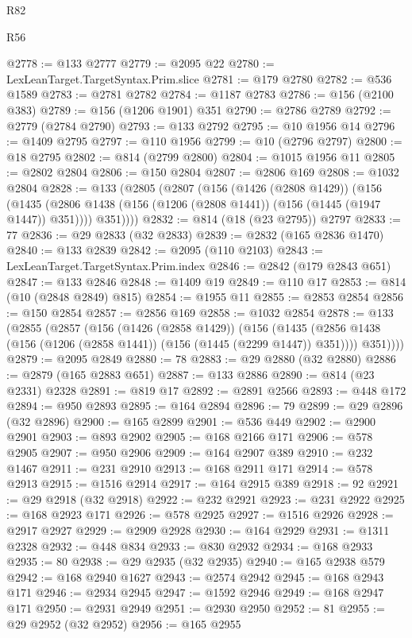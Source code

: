 \begin{lexlean}{R82}
\begin{lexlean}{R56}
\begin{coremodule}
{{{{{{{{{{{{{{{{{{{{{{{{{{{{{{{{{{{{{{{{{{{{{{{{{{{{{{{{{{{{{{{{{{{{{{{{{{{{{{{{{{{{{{{{{{{{{{{{{{{{{{{{{{{{{{{{{{{{{{{{{{{{{{{{{{{{{{{{{{{{{{{{{{{{{{{{{{{{{{{{{{{{{{{{{{{{{{{{{{{{{{{{{{{{{{{{{{{{{{{{{{{{{{{{{{{@2778 := @133 @2777
@2779 := @2095 @22
@2780 := LexLeanTarget.TargetSyntax.Prim.slice
@2781 := @179 @2780
@2782 := @536 @1589
@2783 := @2781 @2782
@2784 := @1187 @2783
@2786 := @156 (@2100 @383)
@2789 := @156 (@1206 @1901) @351
@2790 := @2786 @2789
@2792 := @2779 (@2784 @2790)
@2793 := @133 @2792
@2795 := @10 @1956 @14
@2796 := @1409 @2795
@2797 := @110 @1956
@2799 := @10 (@2796 @2797)
@2800 := @18 @2795
@2802 := @814 (@2799 @2800)
@2804 := @1015 @1956 @11
@2805 := @2802 @2804
@2806 := @150 @2804
@2807 := @2806 @169
@2808 := @1032 @2804
@2828 := @133
    (@2805
      (@2807
        (@156
          (@1426 (@2808 @1429))
          (@156
            (@1435 (@2806 @1438 (@156 (@1206 (@2808 @1441)) (@156 (@1445 (@1947 @1447)) @351))))
            @351))))
@2832 := @814 (@18 (@23 @2795)) @2797
@2833 := 77
@2836 := @29 @2833 (@32 @2833)
@2839 := @2832 (@165 @2836 @1470)
@2840 := @133 @2839
@2842 := @2095 (@110 @2103)
@2843 := LexLeanTarget.TargetSyntax.Prim.index
@2846 := @2842 (@179 @2843 @651)
@2847 := @133 @2846
@2848 := @1409 @19
@2849 := @110 @17
@2853 := @814 (@10 (@2848 @2849) @815)
@2854 := @1955 @11
@2855 := @2853 @2854
@2856 := @150 @2854
@2857 := @2856 @169
@2858 := @1032 @2854
@2878 := @133
    (@2855
      (@2857
        (@156
          (@1426 (@2858 @1429))
          (@156
            (@1435 (@2856 @1438 (@156 (@1206 (@2858 @1441)) (@156 (@1445 (@2299 @1447)) @351))))
            @351))))
@2879 := @2095 @2849
@2880 := 78
@2883 := @29 @2880 (@32 @2880)
@2886 := @2879 (@165 @2883 @651)
@2887 := @133 @2886
@2890 := @814 (@23 @2331) @2328
@2891 := @819 @17
@2892 := @2891 @2566
@2893 := @448 @172
@2894 := @950 @2893
@2895 := @164 @2894
@2896 := 79
@2899 := @29 @2896 (@32 @2896)
@2900 := @165 @2899
@2901 := @536 @449
@2902 := @2900 @2901
@2903 := @893 @2902
@2905 := @168 @2166 @171
@2906 := @578 @2905
@2907 := @950 @2906
@2909 := @164 @2907 @389
@2910 := @232 @1467
@2911 := @231 @2910
@2913 := @168 @2911 @171
@2914 := @578 @2913
@2915 := @1516 @2914
@2917 := @164 @2915 @389
@2918 := 92
@2921 := @29 @2918 (@32 @2918)
@2922 := @232 @2921
@2923 := @231 @2922
@2925 := @168 @2923 @171
@2926 := @578 @2925
@2927 := @1516 @2926
@2928 := @2917 @2927
@2929 := @2909 @2928
@2930 := @164 @2929
@2931 := @1311 @2328
@2932 := @448 @834
@2933 := @830 @2932
@2934 := @168 @2933
@2935 := 80
@2938 := @29 @2935 (@32 @2935)
@2940 := @165 @2938 @579
@2942 := @168 @2940 @1627
@2943 := @2574 @2942
@2945 := @168 @2943 @171
@2946 := @2934 @2945
@2947 := @1592 @2946
@2949 := @168 @2947 @171
@2950 := @2931 @2949
@2951 := @2930 @2950
@2952 := 81
@2955 := @29 @2952 (@32 @2952)
@2956 := @165 @2955
}}}}}}}}}}}}}}}}}}}}}}}}}}}}}}}}}}}}}}}}}}}}}}}}}}}}}}}}}}}}}}}}}}}}}}}}}}}}}}}}}}}}}}}}}}}}}}}}}}}}}}}}}}}}}}}}}}}}}}}}}}}}}}}}}}}}}}}}}}}}}}}}}}}}}}}}}}}}}}}}}}}}}}}}}}}}}}}}}}}}}}}}}}}}}}}}}}}}}}}}}}}}}}}}}}}
\end{coremodule}
\end{lexlean}
\end{lexlean}
